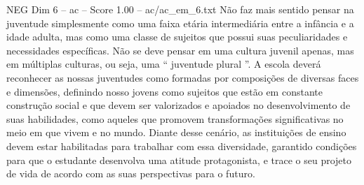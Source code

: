 \begin{textsample}{NEG Dim 6 – ac – Score 1.00 – ac/ac\_em\_6.txt}
Não faz mais sentido pensar na juventude simplesmente como uma faixa etária intermediária entre a infância e a idade adulta, mas como uma classe de sujeitos que possui suas peculiaridades e necessidades específicas.
Não se deve pensar em uma cultura juvenil apenas, mas em múltiplas culturas, ou seja, uma “ juventude plural ”.
A escola deverá reconhecer as nossas juventudes como formadas por composições de diversas faces e dimensões, definindo nosso jovens como sujeitos que estão em constante construção social e que devem ser valorizados e apoiados no desenvolvimento de suas habilidades, como aqueles que promovem transformações significativas no meio em que vivem e no mundo.
Diante desse cenário, as instituições de ensino devem estar habilitadas para trabalhar com essa diversidade, garantido condições para que o estudante desenvolva uma atitude protagonista, e trace o seu projeto de vida de acordo com as suas perspectivas para o futuro.

\end{textsample}
